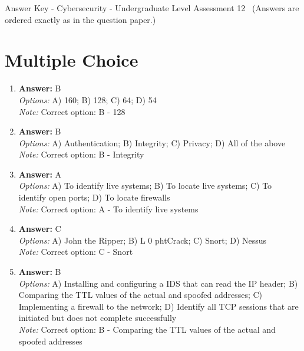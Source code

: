 \documentclass[12pt]{article}
\begin{document}
\begin{center}
Answer Key - Cybersecurity - Undergraduate Level Assessment 12 \
\small (Answers are ordered exactly as in the question paper.)
\end{center}

\section*{Multiple Choice}
\begin{enumerate}[label=\arabic*.]
\item \textbf{Answer:} B
\\ \textit{Options:} A) 160; B) 128; C) 64; D) 54
\\ \textit{Note:} Correct option: B - 128
\item \textbf{Answer:} B
\\ \textit{Options:} A) Authentication; B) Integrity; C) Privacy; D) All of the above
\\ \textit{Note:} Correct option: B - Integrity
\item \textbf{Answer:} A
\\ \textit{Options:} A) To identify live systems; B) To locate live systems; C) To identify open ports; D) To locate firewalls
\\ \textit{Note:} Correct option: A - To identify live systems
\item \textbf{Answer:} C
\\ \textit{Options:} A) John the Ripper; B) L 0 phtCrack; C) Snort; D) Nessus
\\ \textit{Note:} Correct option: C - Snort
\item \textbf{Answer:} B
\\ \textit{Options:} A) Installing and configuring a IDS that can read the IP header; B) Comparing the TTL values of the actual and spoofed addresses; C) Implementing a firewall to the network; D) Identify all TCP sessions that are initiated but does not complete successfully
\\ \textit{Note:} Correct option: B - Comparing the TTL values of the actual and spoofed addresses
\end{enumerate}
\end{document}
